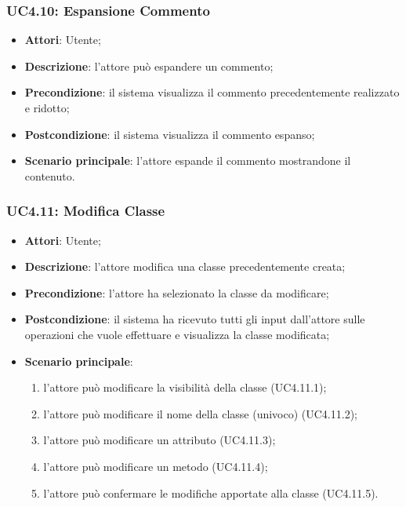\subsubsection{UC4.10: Espansione Commento}
\label{UC4.10}
\begin{itemize}
	\item \textbf{Attori}: Utente;
	\item \textbf{Descrizione}: l'attore può espandere un commento;
	\item \textbf{Precondizione}: il sistema visualizza il commento precedentemente realizzato e ridotto;
	\item \textbf{Postcondizione}: il sistema visualizza il commento espanso;
	\item \textbf{Scenario principale}: l'attore espande il commento mostrandone il contenuto.
\end{itemize}

\subsubsection{UC4.11: Modifica Classe}
\label{UC4.11}
\begin{itemize}
	\item \textbf{Attori}: Utente;
	\item \textbf{Descrizione}: l'attore modifica una classe precedentemente creata;
	\item \textbf{Precondizione}: l'attore ha selezionato la classe da modificare;
	\item \textbf{Postcondizione}: il sistema ha ricevuto tutti gli input dall'attore sulle operazioni che vuole effettuare e visualizza la classe modificata;
	\item \textbf{Scenario principale}:
	\begin{enumerate}
		\item l'attore può modificare la visibilità della classe (UC4.11.1);
		\item l'attore può modificare il nome della classe (univoco) (UC4.11.2);
		\item l'attore può modificare un attributo (UC4.11.3);
		\item l'attore può modificare un metodo (UC4.11.4);
		\item l'attore può confermare le modifiche apportate alla classe (UC4.11.5).
	\end{enumerate}
\end{itemize}

